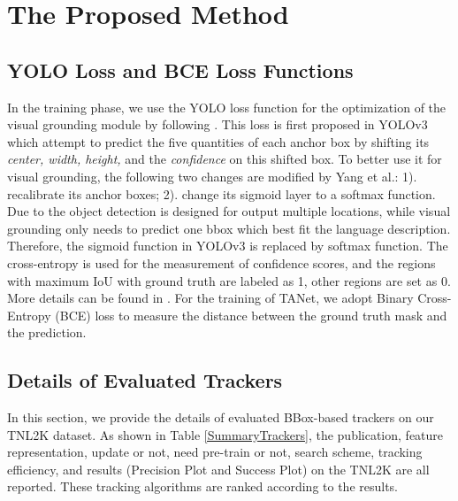 \documentclass[final]{cvpr}
\begin{document}
 






















\section{The Proposed Method}  


\subsection{	YOLO Loss and BCE Loss Functions} 
In the training phase, we use the YOLO loss function for the optimization of the visual grounding module by following \cite{yang2019fastgrounding}. This loss is first proposed in YOLOv3 \cite{redmon2018yolov3}  which attempt to predict the five quantities of each anchor box by shifting its \emph{center, width, height,} and the \emph{confidence} on this shifted box. To better use it for visual grounding, the following two changes are modified by Yang et al.: 1). recalibrate its anchor boxes; 2). change its sigmoid layer to a softmax function. Due to the object detection is designed for output multiple locations, while visual grounding only needs to predict one bbox which best fit the language description. Therefore, the sigmoid function in YOLOv3 is replaced by softmax function. The cross-entropy is used for the measurement of confidence scores, and the regions with maximum IoU with ground truth are labeled as 1, other regions are set as 0. More details can be found in \cite{redmon2018yolov3, yang2019fastgrounding}. For the training of TANet, we adopt Binary Cross-Entropy (BCE) loss to measure the distance between the ground truth mask and the prediction. 



\subsection{Details of Evaluated Trackers } 
In this section, we provide the details of evaluated BBox-based trackers on our TNL2K dataset. As shown in Table \ref{SummaryTrackers}, the publication, feature representation, update or not, need pre-train or not, search scheme, tracking efficiency, and results (Precision Plot and Success Plot) on the TNL2K are all reported. These tracking algorithms are ranked according to the results. 
\end{document}
